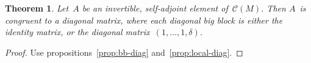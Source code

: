 \documentclass{article}%
\newtheorem{prop}{Proposition}
\newtheorem{thm}{Theorem}
\newtheorem{lem}{Lemma}
\let\ro\mathscr
\def\transpose{\,{}^{\mathrm{t}\!}}
\begin{document}
\begin{thm}\label{thm:diag}
Let~$A$ be an invertible, self-adjoint element of~$\ro C(M)$. Then $A$~is
congruent to a diagonal matrix, where each diagonal big block is either
the identity matrix, or the diagonal matrix~$(1, …, 1, δ)$.
\end{thm}

\begin{proof}
Use propositions~\ref{prop:bb-diag} and~\ref{prop:local-diag}.
\end{proof}


% 
% 
% 
% 
% 
% 
% 
% 
\end{document}
